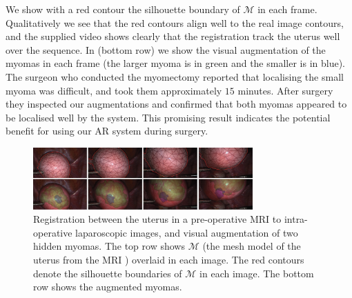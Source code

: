We show with a red contour the silhouette boundary of $\mathcal{M}$ in each frame.
Qualitatively we see that the red contours align well to the real image contours, and the supplied video shows clearly that the registration track the uterus well over the sequence. In  (bottom row) we show the visual augmentation of the myomas in each frame (the larger myoma is in green and the smaller is in blue). The surgeon who conducted the myomectomy reported that localising the small myoma was difficult, and took them approximately $15$ minutes. After surgery they inspected our augmentations and confirmed that both myomas appeared to be localised well by the system. This promising result indicates the potential benefit for using our AR system during surgery.
\begin{figure}[ht]
  \centering
  \includegraphics[width=0.75\textwidth]{./figs/invivoHumanUteri/qualitative.pdf}
  \caption{Registration between the uterus in a pre-operative MRI to intra-operative laparoscopic images, and visual augmentation of two hidden myomas.
The top row shows $\mathcal{M}$ (the mesh model of the uterus from the MRI ) overlaid in each image.
The red contours denote the silhouette boundaries of $\mathcal{M}$ in each image. The bottom row shows the augmented myomas.}
	\label{fig:qualResults}
\end{figure}


